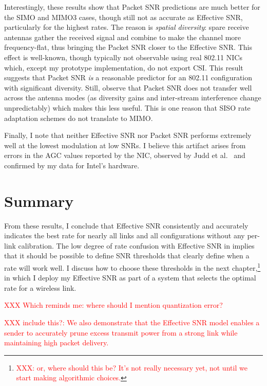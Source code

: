 Interestingly, these results show that Packet SNR predictions are much better for the SIMO and MIMO3 cases, though still not as accurate as Effective SNR, particularly for the highest rates. The reason is \emph{spatial diversity}: spare receive antennas gather the received signal and combine to make the channel more frequency-flat, thus bringing the Packet SNR closer to the Effective SNR. This effect is well-known, though typically not observable using real 802.11 NICs which, except my prototype implementation, do not export CSI. This result suggests that Packet SNR \emph{is} a reasonable predictor for an 802.11 configuration with significant diversity. Still, observe that Packet SNR does not transfer well across the antenna modes (as diversity gains and inter-stream interference change unpredictably) which makes this less useful. This is one reason that SISO rate adaptation schemes do not translate to MIMO.

Finally, I note that neither Effective SNR nor Packet SNR performs extremely well at the lowest modulation at low SNRs. I believe this artifact arises from errors in the AGC values reported by the NIC, observed by Judd et al.~\cite{Judd_CHARM} and confirmed by my data for Intel's hardware.

\section{Summary}
From these results, I conclude that Effective SNR consistently and accurately indicates the best rate for nearly all links and all configurations without any per-link calibration. The low degree of rate confusion with Effective SNR in  implies that it should be possible to define SNR thresholds that clearly define when a rate will work well. I discuss how to choose these thresholds in the next chapter,\footnote{\textcolor{red}{XXX: or, where should this be? It's not really necessary yet, not until we start making algorithmic choices.}} in which I deploy my Effective SNR as part of a system that selects the optimal rate for a wireless link.

\textcolor{red}{XXX Which reminds me: where should I mention quantization error?}

\textcolor{red}{XXX include this?: We also demonstrate that the Effective SNR model enables a sender to accurately prune excess transmit power from a strong link while maintaining high packet delivery.}

\ifx\mainfile\undefined

\fi
